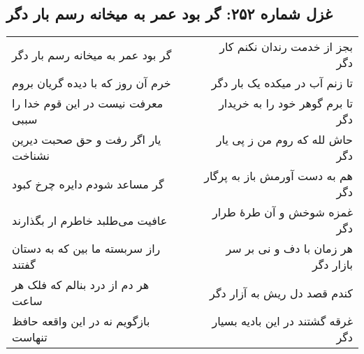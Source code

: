 \begin{center}
\section*{غزل شماره ۲۵۲: گر بود عمر به میخانه رسم بار دگر}
\label{sec:sh252}
\begin{longtable}{l p{0.5cm} r}
گر بود عمر به میخانه رسم بار دگر
&&
بجز از خدمت رندان نکنم کار دگر
\\
خرم آن روز که با دیده گریان بروم
&&
تا زنم آب در میکده یک بار دگر
\\
معرفت نیست در این قوم خدا را سببی
&&
تا برم گوهر خود را به خریدار دگر
\\
یار اگر رفت و حق صحبت دیرین نشناخت
&&
حاش لله که روم من ز پی یار دگر
\\
گر مساعد شودم دایره چرخ کبود
&&
هم به دست آورمش باز به پرگار دگر
\\
عافیت می‌طلبد خاطرم ار بگذارند
&&
غمزه شوخش و آن طرهٔ طرار دگر
\\
راز سربسته ما بین که به دستان گفتند
&&
هر زمان با دف و نی بر سر بازار دگر
\\
هر دم از درد بنالم که فلک هر ساعت
&&
کندم قصد دل ریش به آزار دگر
\\
بازگویم نه در این واقعه حافظ تنهاست
&&
غرقه گشتند در این بادیه بسیار دگر
\\
\end{longtable}
\end{center}

